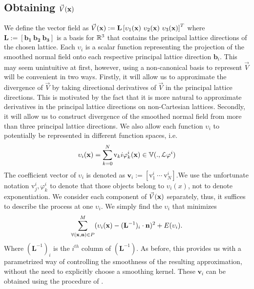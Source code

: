 \subsection{Obtaining $\vec{V}(\vx)$} \label{sec:getting_vd}
\label{sec:obtainingV}
We define the vector field as $\vec{V}(\vx):=\mathbf{L} \left[\upsilon_1(\vx) \ \upsilon_2(\vx) \ \upsilon_3(\vx)\right]^T$ where $\mathbf{L := [b_1 \ b_2 \ b_3]}$ is a basis for $\realn^3$ that contains the principal lattice directions of the chosen lattice. Each $\upsilon_i$ is a scalar function representing the projection of the smoothed normal field onto each respective principal lattice direction $\mathbf{b}_i$. This may seem unintuitive at first, however, using a non-canonical basis to represent $\vec{V}$ will be convenient in two ways. Firstly, it will allow us to approximate the divergence of $\vec{V}$ by taking directional derivatives of $\vec{V}$ in the principal lattice directions. This is motivated by the fact that it is more natural to approximate derivatives in the principal lattice directions on non-Cartesian lattices. Secondly, it will allow us to construct divergence of the smoothed normal field from more than three principal lattice directions. We also allow each function $\upsilon_i$ to potentially be represented in different function spaces, i.e. {\small 
\begin{equation} 
	\upsilon_i(\vx) = \sum_{k=0}^N \text{v}_ki \varphi_k^i(\vx) \in \aspace{\lattice{L}{\varphi^i}}.
\end{equation}}
The coefficient vector of $\upsilon_i$ is denoted as $\mathbf{v}_i:=\left[\text{v}_1^i \ \cdots \ \text{v}_N^i \right]$.We use the unfortunate notation $\text{v}_j^i, \varphi_k^i$ to denote that those objects belong to $\upsilon_i(x)$, not to denote exponentiation. We consider each component of $\vec{V}(\vx)$ separately, thus, it suffices to describe the process at one $\upsilon_i$. We simply find the $\upsilon_i$ that minimizes {\small 
\begin{equation} \label{eq:vari_eqn}
 	\sump_{\forall (\vx,\vn) \in P }^{M} (\upsilon_i(\vx) - (\mathbf{L}^{-1})_i \cdot \mathbf{n})^2 + E(\upsilon_i).
\end{equation} }
Where $(\mathbf{L}^{-1})_i$ is the $i^{th}$ column of $(\mathbf{L}^{-1}).$ As before, this provides us with a parametrized way of controlling the smoothness of the resulting approximation, without the need to explicitly choose a smoothing kernel. These $\mathbf{v}_i$ can be obtained using the procedure of .


